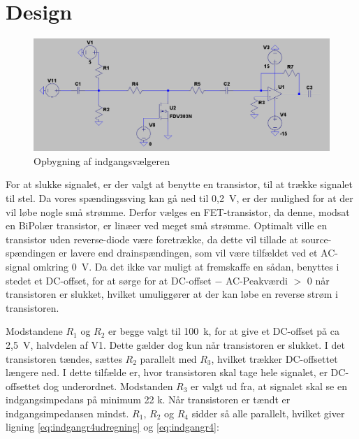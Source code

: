 \section{Design}

\begin{figure}[h]
\centering
\includegraphics[scale=0.4]{teknisk/indgangsvaelger/signal-taend-sluk.png}
\caption{Opbygning af indgangsvælgeren}
\label{indgangsvaelger-overordnet}
\end{figure}
For at slukke signalet, er der valgt at benytte en transistor, til at trække signalet til stel. Da vores spændingssving kan gå ned til 0,2~V, er der mulighed for at der vil løbe nogle små strømme. Derfor vælges en FET-transistor, da denne, modsat en BiPolær transistor, er linæer ved meget små strømme. Optimalt ville en transistor uden reverse-diode være foretrække, da dette vil tillade at source-spændingen er lavere end drainspændingen, som vil være tilfældet ved et AC-signal omkring 0~V. Da det ikke var muligt at fremskaffe en sådan, benyttes i stedet et DC-offset, for at sørge for at DC-offset $-$ AC-Peakværdi $>$ 0 når transistoren er slukket, hvilket umuliggører at der kan løbe en reverse strøm i transistoren.

Modstandene $R_1$ og $R_2$ er begge valgt til 100~k\ohm, for at give et DC-offset på ca 2,5~V, halvdelen af V1. Dette gælder dog kun når transistoren er slukket. I det transistoren tændes, sættes $R_2$ parallelt med $R_3$, hvilket trækker DC-offsettet længere ned.
I dette tilfælde er, hvor transistoren skal tage hele signalet, er DC-offsettet dog underordnet. 
Modstanden $R_3$ er valgt ud fra, at signalet skal se en indgangsimpedans på minimum 22 k\ohm. Når transistoren er tændt er indgangsimpedansen mindst. $R_1$, $R_2$ og $R_4$ sidder så alle parallelt, hvilket giver ligning \ref{eq:indgangr4udregning} og \ref{eq:indgangr4}:

